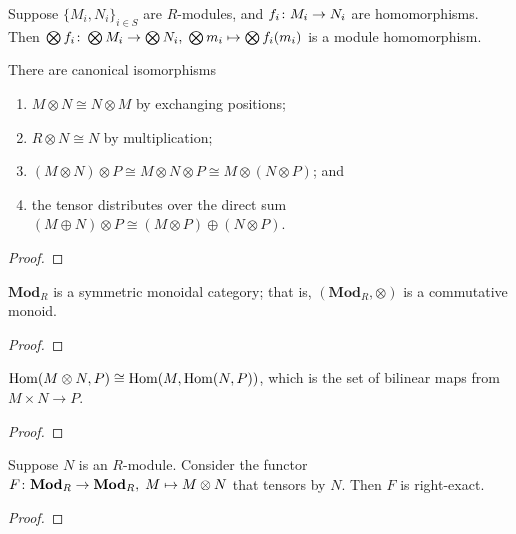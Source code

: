 \begin{definition}
    Suppose \({\{M_i, N_i\}}_{i \in S}\) are \(R\)-modules,
    and \(f_i\colon M_i\to N_i\) are homomorphisms.
    Then \(\bigotimes f_i\colon\bigotimes M_i\to\bigotimes N_i,\;\bigotimes m_i\mapsto\bigotimes f_i(m_i)\)
    is a module homomorphism.
\end{definition}
\begin{theorem}
    There are canonical isomorphisms
    \begin{enumerate}[label={(\alph*)}, itemsep=0mm]
        \item \(M \otimes N \cong N \otimes M\) by exchanging positions;
        \item \(R \otimes N \cong N\) by multiplication;
        \item \((M \otimes N) \otimes P \cong M \otimes N \otimes P \cong M \otimes (N \otimes P)\); and
        \item the tensor distributes over the direct sum
            \((M \oplus N) \otimes P \cong (M \otimes P) \oplus (N \otimes P)\).
    \end{enumerate}
\end{theorem}
\begin{proof}
    
\end{proof}
\begin{corollary}
    \(\textbf{Mod}_R\) is a symmetric monoidal category;
    that is, \((\textbf{Mod}_R,\otimes)\) is a commutative monoid.
\end{corollary}
\begin{proof}
    
\end{proof}

\begin{lemma}
    \(\operatorname{Hom}(M \otimes N, P) \cong \operatorname{Hom}(M,\operatorname{Hom}(N,P))\),
    which is the set of bilinear maps from \(M \times N \to P\).
\end{lemma}
\begin{proof}
    
\end{proof}
\begin{theorem}
    Suppose \(N\) is an \(R\)-module.
    Consider the functor \(F\colon\textbf{Mod}_R\to\textbf{Mod}_R,\;M\mapsto M \otimes N\)
    that tensors by \(N\).
    Then \(F\) is right-exact.
\end{theorem}
\begin{proof}
    
\end{proof}


